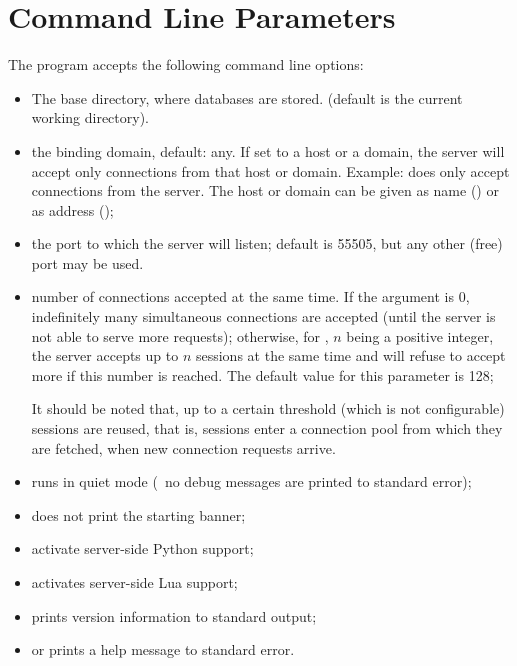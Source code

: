 \section{Command Line Parameters}
\begin{minipage}{\textwidth}
The program accepts the following
command line options:

\begin{itemize}
\item {} The base directory,
where databases are stored.
(default is the current working directory).

\item {} the binding domain, default:
any. If set to a host or a domain, the server
will accept only connections from that host
or domain. Example:  does
only accept connections from the server.
The host or domain can be given as name ()
or as  address ();

\item {} the port to which
the server will listen; default is 55505,
but any other (free) port may be used.
 
\item {} number of connections accepted at the same time.
If the argument is 0, indefinitely many
simultaneous connections are accepted
(until the server is not able to serve more requests);
otherwise, for ,
$n$ being a positive integer,
the server accepts
up to $n$ sessions at the same time and
will refuse to accept more if this number is reached.
The default value for this parameter is 128;

It should be noted that, up to a certain threshold
(which is not configurable) sessions are
reused, that is, sessions enter a connection pool
from which they are fetched, when new connection
requests arrive.

\item {} runs in quiet mode
(\ie\ no debug messages are printed to standard error);
\item {} does not print the starting banner;
\item {} activate server-side Python support;
\item {} activates server-side Lua support;
\item {} prints version information to standard output;
\item {} or  prints a help message to standard error.
\end{itemize}
\end{minipage}


